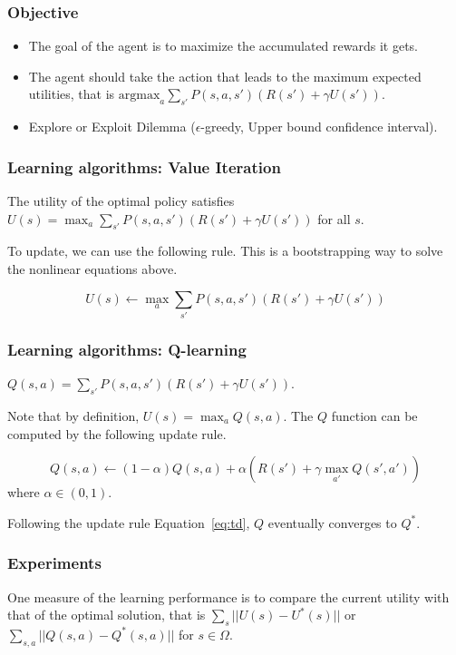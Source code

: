 \documentclass{beamer}
\begin{document}
\begin{frame}
\frametitle{Objective}
\begin{itemize}
\item The goal of the agent is to maximize the accumulated rewards it gets.
\item The agent should take the action that leads to the maximum expected
utilities, that is ${\mathrm{argmax}}_a \sum_{s'} P(s, a, s') (R(s') + \gamma
U(s'))$.
\item Explore or Exploit Dilemma ($\epsilon$-greedy, Upper bound confidence interval).
\end{itemize}
\end{frame}

\begin{frame}
\frametitle{Learning algorithms: Value Iteration}
\begin{theorem}
The utility of the optimal policy satisfies $U(s) = \max_a \sum_{s'} P(s, a, s')
(R(s') + \gamma U(s'))$ for all $s$.
\end{theorem}

To update, we can use the following rule. This is a bootstrapping way to solve
the nonlinear equations above.

\begin{equation}\label{eq:vl}
U(s) \leftarrow \max_a \sum_{s'} P(s, a, s') (R(s') + \gamma U(s'))
\end{equation} 
\end{frame}

\begin{frame}
\frametitle{Learning algorithms: Q-learning}
\begin{definition}
$Q(s, a) = \sum_{s'} P(s, a, s') (R(s') + \gamma U(s'))$.
\end{definition}
Note that by definition, $U(s) = \max_a Q(s, a)$. The $Q$ function can be
computed by the following update rule.

\begin{equation}\label{eq:td}
Q(s, a) \leftarrow (1 - \alpha) Q(s, a) + \alpha (R(s') + \gamma \max_{a'} Q(s',
a'))
\end{equation} 
where $\alpha \in (0, 1)$. 

\begin{theorem}
Following the update rule Equation~\ref{eq:td}, $Q$ eventually converges to $Q^*$.
\end{theorem}
\end{frame}

\begin{frame}
\frametitle{Experiments}
One measure of the learning performance is to compare the current utility with
that of the optimal solution, that is $\sum_s ||U(s) - U^*(s)||$ or $\sum_{s,a}
||Q(s, a) - Q^*(s, a)||$ for $s \in \Omega$.
\end{frame}
\end{document}
